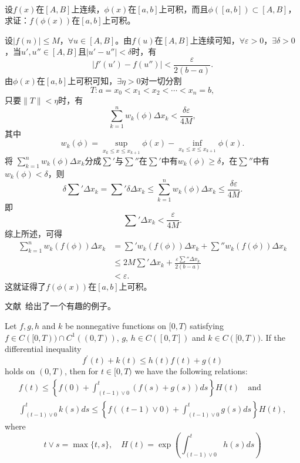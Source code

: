 \begin{example}
\hfill\\
 设$f(x)$在$[A,B]$上连续，$\phi(x)$在$[a,b]$上可积，而且$\phi([a,b])\subset[A,B]$，求证：$f(\phi(x))$在$[a,b]$上可积。
 
   设$|f(n)|\leq M$，$\forall u\in[A,B]$。由$f(u)$在$[A,B]$上连续可知，$\forall\varepsilon>0$，$\exists\delta>0$，当$u',u''\in[A,B]$且$|u'-u''|<\delta$时，有
  $$|f'(u')-f(u'')|<\frac{\varepsilon}{2(b-a)}.$$
  由$\phi(x)$在$[a,b]$上可积可知，$\exists\eta>0$对一切分割
  $$T:a=x_0<x_1<x_2<\cdots<x_n=b,$$
  只要$\|T\|<\eta$时，有
  $$\sum_{k=1}^nw_k(\phi)\Delta x_k<\frac{\delta\varepsilon}{4M},$$
  其中$$w_k(\phi)=\sup_{x_k\leq x\leq x_{k+1}}\phi(x)-\inf_{x_k\leq x\leq x_{k+1}}\phi(x).$$
  将 $\sum\limits_{k=1}^nw_k(\phi)\Delta x_k$分成$\sum\limits'$与$\sum\limits''$在$\sum\limits'$中有$w_k(\phi)\geq\delta$，在$\sum\limits''$中有$w_k(\phi)<\delta$，则
  $$\delta\sum'\Delta x_k=\sum'\delta\Delta x_k\leq\sum_{k=1}^nw_k(\phi)\Delta x_k\leq\frac{\delta\varepsilon}{4M}.$$
  即$$\sum'\Delta x_k<\frac{\varepsilon}{4M}.$$
  综上所述，可得
  \begin{align*}
  \sum_{k=1}^nw_k(f(\phi))\Delta x_k&=\sum'w_k(f(\phi))\Delta x_k+\sum''w_k(f(\phi))\Delta x_k\\
  &\leq2M\sum'\Delta x_k+\frac{\varepsilon\sum''\Delta x_k}{2(b-a)}\\
  &<\varepsilon.
  \end{align*}
  这就证得了$f(\phi(x))$在$[a,b]$上可积。
\end{example}  

文献~\cite[Lemma~4.3]{Nagai1995}给出了一个有趣的例子。

\begin{example}
  Let $f, g, h$ and $k$ be nonnegative functions on $[0, T)$ satisfying $f \in C([0, T) )\cap C^1((0, T))$, $g$, $h \in C([0, T])$ and $k \in C([0, T))$. 
  If the differential inequality
$$
f^{\prime}(t)+k(t) \leq h(t) f(t)+g(t)
$$
holds on $(0, T)$, 
then for $t \in[0, T)$ we have the following relations:
$$
\begin{gathered}
f(t) \leq\left\{f(0)+\int_{(t-1) \vee 0}^t(f(s)+g(s)) d s\right\} H(t)\quad\text{and} \\
\int_{(t-1) \vee 0}^t k(s) d s \leq\left\{f((t-1) \vee 0)+\int_{(t-1) \vee 0}^t g(s) d s\right\} H(t),
\end{gathered}
$$
where
$$
t \vee s=\max \{t, s\}, \quad H(t)=\exp \left(\int_{(t-1) \vee 0}^t h(s) d s\right)
$$
\end{example}

